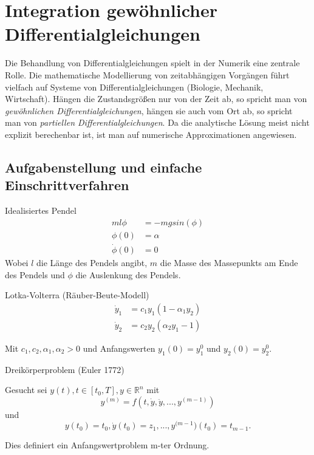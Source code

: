 \section{Integration gewöhnlicher Differentialgleichungen}

Die Behandlung von Differentialgleichungen spielt in der Numerik eine zentrale Rolle. Die mathematische Modellierung von zeitabhängigen Vorgängen führt vielfach auf Systeme von Differentialgleichungen (Biologie, Mechanik, Wirtschaft). Hängen die Zustandsgrößen nur von der Zeit ab, so spricht man von \emph{gewöhnlichen Differentialgleichungen}, hängen sie auch vom Ort ab, so spricht man von \emph{partiellen Differentialgleichungen}. Da die analytische Lösung meist nicht explizit berechenbar ist, ist man auf numerische Approximationen angewiesen.

\subsection{Aufgabenstellung und einfache Einschrittverfahren}

\begin{example} 
	Idealisiertes Pendel
	\begin{align}
		\nonumber m l \phi &= -m g sin(\phi)\\
		\nonumber \phi(0) &= \alpha\\
		\nonumber \dot{\phi}(0) &= 0
	\end{align}
	Wobei $l$ die Länge des Pendels angibt, $m$ die Masse des Massepunkts am Ende des Pendels und $\phi$ die Auslenkung des Pendels.
\end{example}

\begin{example} 
	Lotka-Volterra (Räuber-Beute-Modell)
	\begin{align}
		\nonumber\dot{y}_1 &= c_1y_1(1-\alpha_1y_2)\\
		\nonumber\dot{y}_2 &= c_2y_2(\alpha_2y_1-1)
	\end{align}
		
	Mit $c_1, c_2, \alpha_1, \alpha_2 > 0$ und Anfangswerten $y_1(0) = y^0_1$ und $y_2(0) = y^0_2$.
\end{example}

\begin{example} 
	Dreikörperproblem (Euler 1772)
\end{example}

\begin{definition}[Definition IV.1]
	Gesucht sei 
	$y(t), t \in [t_0, T], y \in \mathbb{R}^n$ mit 
	$$y^{(m)} = f(t, \dot{y}, \ddot{y}, ..., y^{(m-1)})$$
	und
	$$y(t_0) = t_0, \dot{y}(t_0) = z_1, ..., y^{(m-1})(t_0) = t_{m-1}.$$
	
	Dies definiert ein Anfangswertproblem m-ter Ordnung.
\end{definition}

